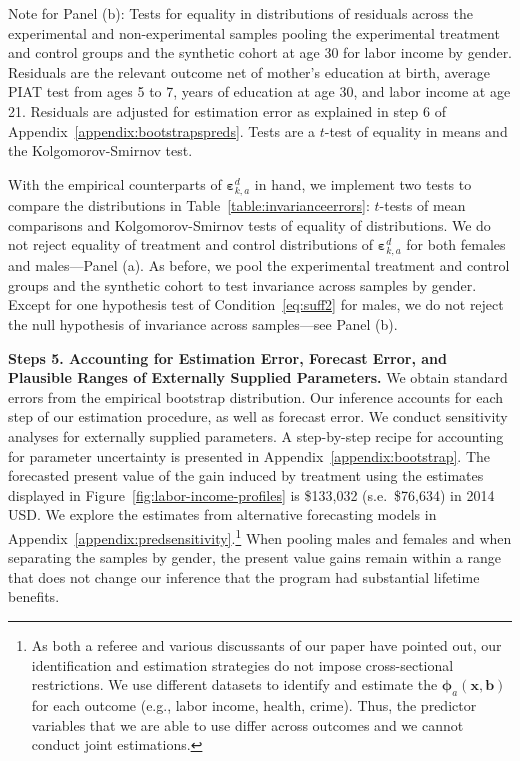 \begin{table}[H]
\begin{threeparttable}
\begin{tablenotes}
Note for Panel (b): Tests for equality in distributions of residuals across the experimental and non-experimental samples pooling the experimental treatment and control groups and the synthetic cohort at age 30 for labor income by gender.  Residuals are the relevant outcome net of mother's education at birth, average PIAT test from ages 5 to 7, years of education at age 30, and labor income at age 21. Residuals are adjusted for estimation error as explained in step 6 of Appendix~\ref{appendix:bootstrapspreds}. Tests are a $t$-test of equality in means and the Kolgomorov-Smirnov test.\\
\end{tablenotes}
\end{threeparttable}
\end{table}

With the empirical counterparts of $\bm{\varepsilon}_{k,a}^d$ in hand, we implement two tests to compare the distributions in Table~\ref{table:invarianceerrors}: $t$-tests of mean comparisons and Kolgomorov-Smirnov tests of equality of distributions. We do not reject equality of treatment and control distributions of $\bm{\varepsilon}_{k,a}^d$ for both females and males---Panel (a). As before, we pool the experimental treatment and control groups and the synthetic cohort to test invariance across samples by gender. Except for one hypothesis test of Condition~\eqref{eq:suff2} for males, we do not reject the null hypothesis of invariance across samples---see Panel (b).

\textbf{Steps 5. Accounting for Estimation Error, Forecast Error, and Plausible Ranges of Externally Supplied Parameters.} We obtain standard errors from the empirical bootstrap distribution. Our inference accounts for each step of our estimation procedure, as well as forecast error. We conduct sensitivity analyses for externally supplied parameters. A step-by-step recipe for accounting for parameter uncertainty is presented in Appendix~\ref{appendix:bootstrap}. The forecasted present value of the gain induced by treatment using the estimates displayed in Figure~\ref{fig:labor-income-profiles} is \$133,032 (s.e.\ \$76,634) in 2014 USD. We explore the estimates from alternative forecasting models in Appendix~\ref{appendix:predsensitivity}.\footnote{As both a referee and various discussants of our paper have pointed out, our identification and estimation strategies do not impose cross-sectional restrictions. We use different datasets to identify and estimate the  $\bm{\phi}_{a} \left( \bm{x}, \bm{b} \right)$ for each outcome (e.g., labor income, health, crime). Thus, the predictor variables that we are able to use differ across outcomes and we cannot conduct joint estimations.} When pooling males and females and when separating the samples by gender, the present value gains remain within a range that does not change our inference that the program had substantial lifetime benefits.

